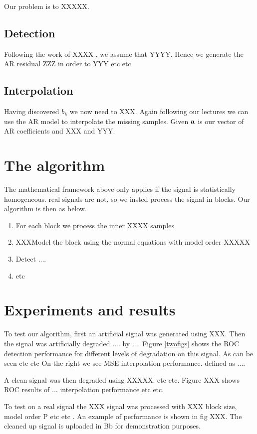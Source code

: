 \documentclass[11pt, a4paper]{article}
\begin{document}
 Our problem is to XXXXX.
 
 \subsection{Detection}
 Following the work of XXXX \cite{boykov_2001}, we assume that YYYY. Hence we generate the AR residual ZZZ in order to YYY etc etc
 
 \subsection{Interpolation}
 Having discovered $b_k$ we now need to XXX. Again following our lectures we can use the AR model to interpolate the missing samples. Given ${\bf a}$ is our vector of AR coefficients and XXX and YYY. 
 

\section{The algorithm}
The mathematical framework above only applies if the signal is statistically homogeneous. real signals are not, so we insted process the signal in blocks. Our algorithm is then as below.
\begin{enumerate}
    \item For each block we process the inner XXXX samples
    \item XXXModel the block using the normal equations with model order XXXXX
    \item Detect ....
    \item etc
\end{enumerate}



\section{Experiments and results}
To test our algorithm, first an artificial signal was generated using XXX. Then the signal was artificially degraded .... by .... Figure \ref{twofigs} shows the ROC detection performance for different levels of degradation on this signal. As can be seen etc etc On the right we see MSE interpolation performance. defined as ....

A clean signal was then degraded using XXXXX. etc  etc. Figure XXX shows ROC results of ... interpolation performance etc etc.

To test on a real signal the XXX signal was processed with XXX block size, model order P etc etc . An example of performance is shown in fig XXX. The cleaned up signal is uploaded in Bb for demonstration purposes.
\end{document}
